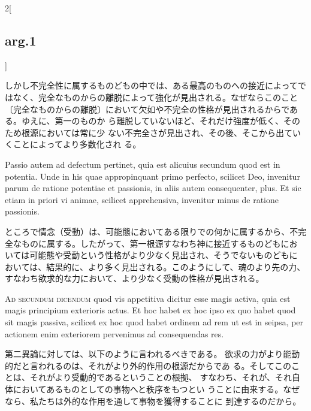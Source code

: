 \documentclass[paper=a4paper,fontsize=10pt,jafontsize=9pt,titlepage]{jlreq}
\begin{document}
\begin{paracol}{2}[\subsection{arg.1}]
\switchcolumn

しかし不完全性に属するものどもの中では、ある最高のものへの接近によってで
 はなく、完全なものからの離脱によって強化が見出される。なぜならこのこと
 〔完全なものからの離脱〕において欠如や不完全の性格が見出されるからである。ゆえに、第一のものか
 ら離脱していないほど、それだけ強度が低く、そのため根源においては常に少
 ない不完全さが見出され、その後、そこから出ていくことによってより多数化され
 る。

\switchcolumn*

Passio autem ad defectum pertinet, quia est alicuius
 secundum quod est in potentia. Unde in his quae appropinquant primo
 perfecto, scilicet Deo, invenitur parum de ratione potentiae et
 passionis, in aliis autem consequenter, plus. Et sic etiam in priori vi
 animae, scilicet apprehensiva, invenitur minus de ratione passionis.

\switchcolumn

ところで情念（受動）は、可能態においてある限りでの何かに属するから、不完
 全なものに属する。したがって、第一根源すなわち神に接近するものどもにお
 いては可能態や受動という性格がより少なく見出され、そうでないものどもに
 おいては、結果的に、より多く見出される。このようにして、魂のより先の力、
 すなわち欲求的な力において、より少なく受動の性格が見出される。

\switchcolumn*[\subsection{ad.2}]

{\scshape Ad secundum dicendum} quod vis appetitiva dicitur esse magis activa, quia
 est magis principium exterioris actus. Et hoc habet ex hoc ipso ex quo
 habet quod sit magis passiva, scilicet ex hoc quod habet ordinem ad rem
 ut est in seipsa, per actionem enim exteriorem pervenimus ad
 consequendas res.

\switchcolumn

第二異論に対しては、以下のように言われるべきである。
欲求の力がより能動的だと言われるのは、それがより外的作用の根源だからであ
 る。そしてこのことは、それがより受動的であるということの根拠、
すなわち、それが、それ自体においてあるものとしての事物へと秩序をもつとい
 うことに由来する。なぜなら、私たちは外的な作用を通して事物を獲得することに
 到達するのだから。

\switchcolumn*[\subsection{ad.3}]


\end{paracol}
\end{document}
